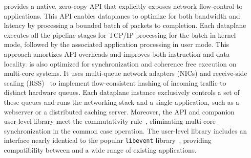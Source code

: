 \ix provides a native, zero-copy API that explicitly exposes network
flow-control to applications.  This API enables dataplanes to optimize
for both bandwidth and latency by processing a bounded batch of
packets to completion.  Each dataplane executes all the pipeline
stages for TCP/IP processing for the batch in kernel mode, followed by
the associated application processing in user mode. This approach
amortizes API overheads and improves both instruction and data
locality.  \ix is also optimized for synchronization and coherence
free execution on multi-core systems. It uses multi-queue network
adapters (NICs) and receive-side scaling (RSS)~\cite{url:rss} to
implement flow-consistent hashing of incoming traffic to distinct
hardware queues. Each dataplane instance exclusively controls a set of
these queues and runs the networking stack and a single application,
such as a webserver or a distributed caching server. Moreover, the \ix
API and companion user-level library meet the commutativity
rule~\cite{DBLP:conf/sosp/ClementsKZMK13}, eliminating multi-core
synchronization in the common case operation. The \ix user-level
library includes an interface nearly identical to the popular
\texttt{libevent} library~\cite{provos2003libevent}, providing
compatibility between \ix and a wide range of existing applications.





